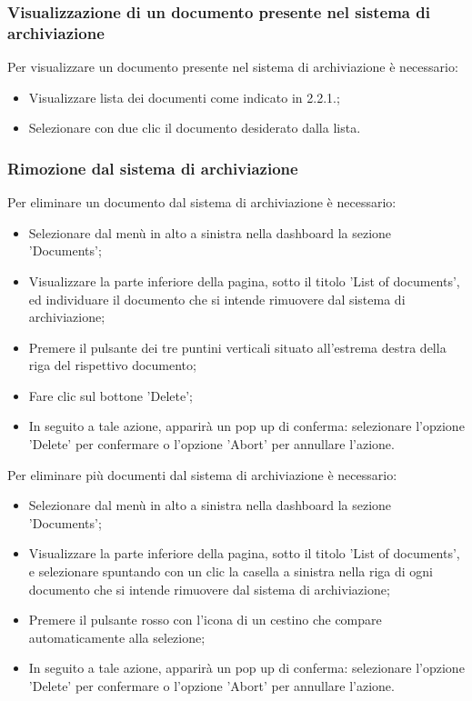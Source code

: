 \documentclass[10pt, a4paper]{article}
\begin{document}
\subsubsection{Visualizzazione di un documento presente nel sistema di archiviazione}
Per visualizzare un documento presente nel sistema di archiviazione è necessario:
\begin{itemize}
    \item Visualizzare lista dei documenti come indicato in 2.2.1.;
    \item Selezionare con due clic il documento desiderato dalla lista.
\end{itemize}
\subsubsection{Rimozione dal sistema di archiviazione}
Per eliminare un documento dal sistema di archiviazione è necessario:
\begin{itemize}
    \item Selezionare dal menù in alto a sinistra nella dashboard la sezione 'Documents';
    \item Visualizzare la parte inferiore della pagina, sotto il titolo 'List of documents', ed individuare il documento che si intende rimuovere dal sistema di archiviazione;
    \item Premere il pulsante dei tre puntini verticali situato all'estrema destra della riga del rispettivo documento;
    \item Fare clic sul bottone 'Delete';
    \item In seguito a tale azione, apparirà un pop up di conferma: selezionare l'opzione 'Delete' per confermare o l'opzione 'Abort' per annullare l'azione.
\end{itemize}
Per eliminare più documenti dal sistema di archiviazione è necessario:
\begin{itemize}
    \item Selezionare dal menù in alto a sinistra nella dashboard la sezione 'Documents';
    \item Visualizzare la parte inferiore della pagina, sotto il titolo 'List of documents', e selezionare spuntando con un clic la casella a sinistra nella riga di ogni documento che si intende rimuovere dal sistema di archiviazione;
    \item Premere il pulsante rosso con l'icona di un cestino che compare automaticamente alla selezione;
    \item In seguito a tale azione, apparirà un pop up di conferma: selezionare l'opzione 'Delete' per confermare o l'opzione 'Abort' per annullare l'azione.
\end{itemize}
\end{document}
